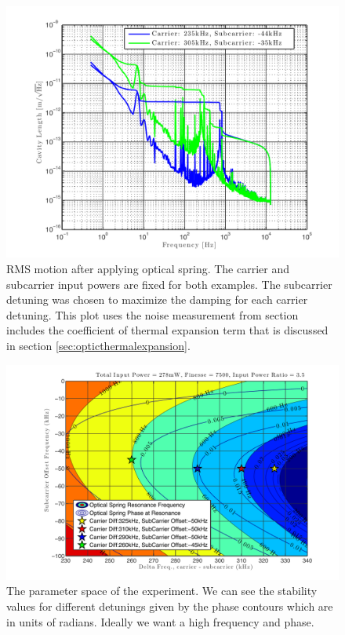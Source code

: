 \begin{figure}
  \centering
  \includegraphics[width=14cm]{./figures/rmsspringcompare.pdf}
  \caption[RMS Optical Spring Residual Motion]{
    RMS motion after applying optical spring.
    The carrier and subcarrier input powers are fixed for both examples.
    The subcarrier detuning was chosen to maximize the damping for each
    carrier detuning.
    This plot uses the noise measurement from section 
    includes the coefficient of thermal expansion term that
    is discussed in section \ref{sec:opticthermalexpansion}.
    }
  \label{fig:rmsspringcompare}
\end{figure}





\begin{figure}
  \centering
  \includegraphics[width=14cm]{./figures/experiment2space.pdf}
  \caption[Parameter Space for 2nd Edition]{The parameter space of the
    experiment.
    We can see the stability values for different detunings given
    by the phase contours which are in units of radians.
    Ideally we want a high frequency and phase.
    }
  \label{fig:experiment2space}
\end{figure}


